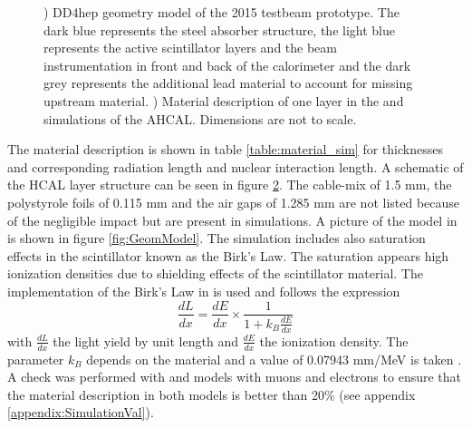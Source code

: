 \begin{figure}[htbp!]
\begin{subfigure}[t]{0.39\textwidth}
    \caption{} \label{fig:material_layout}
  \end{subfigure}
  \caption{) DD4hep geometry model of the 2015 testbeam prototype. The dark blue represents the steel absorber structure, the light blue represents the active scintillator layers and the beam instrumentation in front and back of the calorimeter and the dark grey represents the additional lead material to account for missing upstream material. ) Material description of one layer in the \mokka and \ddhep simulations of the AHCAL. Dimensions are not to scale.}
\end{figure}

The material description is shown in table \ref{table:material_sim} for thicknesses and corresponding radiation length and nuclear interaction length. A schematic of the HCAL layer structure can be seen in figure \ref{fig:material_layout}. The cable-mix of 1.5 mm, the polystyrole foils of 0.115 mm and the air gaps of 1.285 mm are not listed because of the negligible impact but are present in simulations. A picture of the model in \ddhep is shown in figure \ref{fig:GeomModel}. The simulation includes also saturation effects in the scintillator known as the Birk's Law. The saturation appears high ionization densities due to shielding effects of the scintillator material. The implementation of the Birk's Law in \geant is used and follows the expression
\begin{equation}
  \frac{dL}{dx} = \frac{dE}{dx} \times \frac{1}{1 + k_B \frac{dE}{dx}}
\end{equation}
with $\frac{dL}{dx}$ the light yield by unit length and $\frac{dE}{dx}$ the ionization density. The parameter $k_B$ depends on the material and a value of 0.07943 mm/MeV is taken \cite{kB:IEEE}.
A check was performed with \mokka and \ddhep models with muons and electrons to ensure that the material description in both models is better than 20\% (see appendix \ref{appendix:SimulationVal}).
